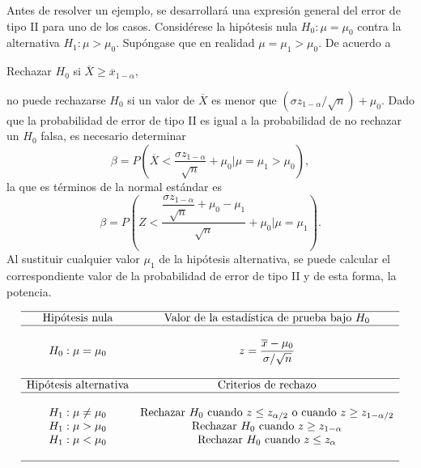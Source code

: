 Antes de resolver un ejemplo, se desarrollará una expresión general del error de tipo II para uno de los casos. Considérese la hipótesis nula $H_0:\mu=\mu_0$ contra la alternativa $H_1:\mu>\mu_0$. Supóngase que en realidad $\mu=\mu_1>\mu_0$. De acuerdo a 
\begin{center}
    Rechazar $H_0$ si $\overline{X}\geq \overline{x}_{1-\alpha},$
\end{center}
no puede rechazarse $H_0$ si un valor de $\overline{X}$ es menor que $(\sigma z_{1-\alpha}/\sqrt{n})+\mu_0$. Dado que la probabilidad de error de tipo II es igual a la probabilidad de no rechazar un $H_0$ falsa, es necesario determinar
$$\beta = P\left(\overline{X}<\dfrac{\sigma z_{1-\alpha}}{\sqrt{n}}+\mu_0 \bigg| \mu=\mu_1>\mu_0\right),$$
la que es términos de la normal estándar es
$$\beta = P\left(Z<\dfrac{\dfrac{\sigma z_{1-\alpha}}{\sqrt{n}}+\mu_0-\mu_1}{\sqrt{n}}+\mu_0 \Bigg| \mu=\mu_1\right).$$
Al sustituir cualquier valor $\mu_1$ de la hipótesis alternativa, se puede calcular el correspondiente valor de la probabilidad de error de tipo II y de esta forma, la potencia.

$$
\begin{array}{cc}
    \hline
    \mbox{Hipótesis nula} & \mbox{Valor de la estadística de prueba bajo } H_0\\
    \hline\\
    H_0: \mu=\mu_0 & z=\dfrac{\overline{x}-\mu_0}{\sigma/\sqrt{n}}\\\\
    \hline
    \mbox{Hipótesis alternativa} & \mbox{Criterios de rechazo}\\
    \hline\\
    H_1:\mu\neq \mu_0 & \mbox{Rechazar } H_0 \mbox{ cuando } z\leq z_{\alpha/2} \mbox{ o cuando } z\geq z_{1-\alpha/2}\\
    H_1:\mu> \mu_0 & \mbox{Rechazar } H_0 \mbox{ cuando } z\geq z_{1-\alpha}\\
    H_1:\mu< \mu_0 & \mbox{Rechazar } H_0 \mbox{ cuando } z\leq z_{\alpha}\\\\
    \hline
\end{array}
$$

